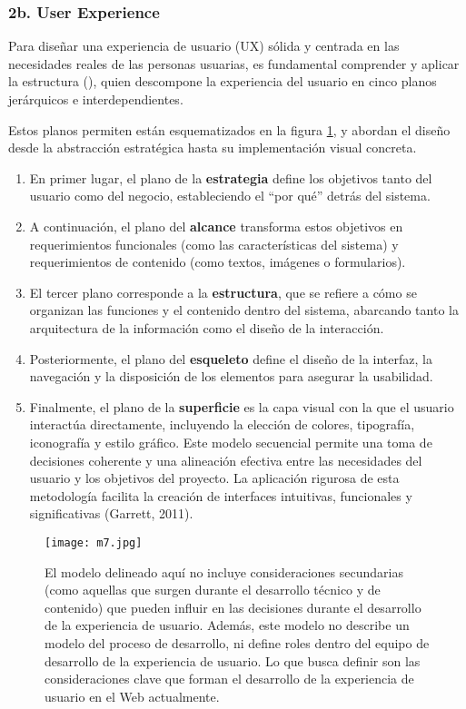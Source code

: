 \subsubsection{2b. User Experience}

Para diseñar una experiencia de usuario (UX) sólida y centrada en las necesidades reales de las personas usuarias, es fundamental comprender y aplicar la estructura (\cite{garrett2011elements}), quien descompone la experiencia del usuario en cinco planos jerárquicos e interdependientes. 

Estos planos permiten están esquematizados en la figura \ref{m7}, y abordan el diseño desde la abstracción estratégica hasta su implementación visual concreta. 

\begin{enumerate}
  \item En primer lugar, el plano de la \textbf{estrategia} define los objetivos tanto del usuario como del negocio, estableciendo el ``por qué'' detrás del sistema. 
  
   \item A continuación, el plano del \textbf{alcance} transforma estos objetivos en requerimientos funcionales (como las características del sistema) y requerimientos de contenido (como textos, imágenes o formularios).

 \item El tercer plano corresponde a la \textbf{estructura}, que se refiere a cómo se organizan las funciones y el contenido dentro del sistema, abarcando tanto la arquitectura de la información como el diseño de la interacción. 
 
  \item Posteriormente, el plano del \textbf{esqueleto} define el diseño de la interfaz, la navegación y la disposición de los elementos para asegurar la usabilidad. 
  
   \item Finalmente, el plano de la \textbf{superficie} es la capa visual con la que el usuario interactúa directamente, incluyendo la elección de colores, tipografía, iconografía y estilo gráfico. Este modelo secuencial permite una toma de decisiones coherente y una alineación efectiva entre las necesidades del usuario y los objetivos del proyecto. La aplicación rigurosa de esta metodología facilita la creación de interfaces intuitivas, funcionales y significativas (Garrett, 2011).
\end{enumerate}


\begin{figure}[h!]
\centering
  \texttt{[image: m7.jpg]}
  \caption{ El modelo delineado aquí no incluye consideraciones secundarias (como aquellas que surgen durante el desarrollo técnico y de contenido) que pueden influir en las decisiones durante el desarrollo de la experiencia de usuario. Además, este modelo no describe un modelo del proceso de desarrollo, ni define roles dentro del equipo de desarrollo de la experiencia de usuario. Lo que busca definir son las consideraciones clave que forman el desarrollo de la experiencia de usuario en el Web actualmente. \cite{garrett2011elements}}
  \label{m7}
\end{figure}

